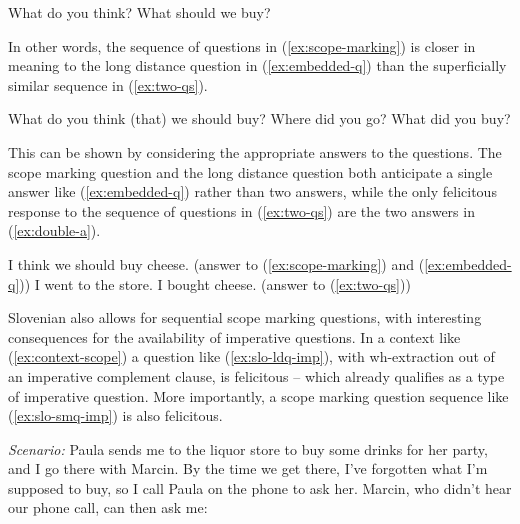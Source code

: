\documentclass[output=paper,colorlinks,citecolor=brown]{langscibook}
\begin{document}
\ea {}What do you think? What should we buy?\label{ex:scope-marking}\hfill \citep[][39]{dayal16}
\z

\noindent In other words, the sequence of questions in (\ref{ex:scope-marking}) is closer in meaning to the long distance question in (\ref{ex:embedded-q}) than the superficially similar sequence in (\ref{ex:two-qs}).

\ea {}
    \ea What do you think (that) we should buy?\label{ex:embedded-q}
    \ex Where did you go? What did you buy?\label{ex:two-qs}\hfill \citep[][39]{dayal16}
\z\z   

\noindent This can be shown by considering the appropriate answers to the questions. The scope marking question and the long distance question both anticipate a single answer like (\ref{ex:embedded-q}) rather than two answers, while the only felicitous response to the sequence of questions in (\ref{ex:two-qs}) are the two answers in (\ref{ex:double-a}).   

\ea {}
    \ea \label{ex:single-a} I think we should buy cheese. \hfill (answer to (\ref{ex:scope-marking}) and (\ref{ex:embedded-q}))
    \ex \label{ex:double-a} I went to the store. I bought cheese. \hfill (answer to (\ref{ex:two-qs}))\smallskip\\\hfill \citep[based on][39--40]{dayal16}
\z\z 

\noindent Slovenian also allows for sequential scope marking questions, with interesting consequences for the availability of imperative questions. In a context like (\ref{ex:context-scope}) a question like (\ref{ex:slo-ldq-imp}), with wh-extraction out of an imperative complement clause, is felicitous -- which already qualifies as a type of imperative question. More importantly, a scope marking question sequence like (\ref{ex:slo-smq-imp}) is also felicitous.

\eanoraggedright{}\textit{Scenario:} Paula sends me to the liquor store to buy some drinks for her party, and I go there with Marcin. By the time we get there, I've forgotten what I'm supposed to buy, so I call Paula on the phone to ask her. Marcin, who didn't hear our phone call, can then ask me:\label{ex:context-scope}
\z\z
\end{document}
